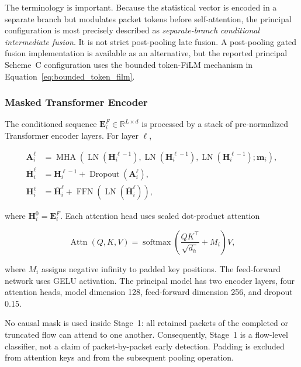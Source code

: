 The terminology is important. Because the statistical vector is encoded in a
separate branch but modulates packet tokens before self-attention, the principal
configuration is most precisely described as \emph{separate-branch conditional
intermediate fusion}. It is not strict post-pooling late fusion. A post-pooling
gated fusion implementation is available as an alternative, but the reported
principal Scheme~C configuration uses the bounded token-FiLM mechanism in
Equation~\ref{eq:bounded_token_film}.

\subsubsection{Masked Transformer Encoder}
\label{subsubsec:stage1_transformer}

The conditioned sequence
$\mathbf{E}^{F}_i\in\mathbb{R}^{L\times d}$ is processed by a stack of
pre-normalized Transformer encoder layers. For layer $\ell$,

\begin{align}
    \mathbf{A}^{\ell}_i
    &=\operatorname{MHA}
      \left(
        \operatorname{LN}(\mathbf{H}^{\ell-1}_i),
        \operatorname{LN}(\mathbf{H}^{\ell-1}_i),
        \operatorname{LN}(\mathbf{H}^{\ell-1}_i);
        \mathbf{m}_i
      \right),\\
    \overline{\mathbf{H}}^{\ell}_i
    &=\mathbf{H}^{\ell-1}_i
      +\operatorname{Dropout}(\mathbf{A}^{\ell}_i),\\
    \mathbf{H}^{\ell}_i
    &=\overline{\mathbf{H}}^{\ell}_i
      +\operatorname{FFN}
       \left(\operatorname{LN}(\overline{\mathbf{H}}^{\ell}_i)\right),
    \label{eq:stage1_transformer_layer}
\end{align}

where $\mathbf{H}^{0}_i=\mathbf{E}^{F}_i$. Each attention head uses scaled
dot-product attention

\begin{equation}
    \operatorname{Attn}(Q,K,V)
    =\operatorname{softmax}
      \left(
        \frac{QK^{\top}}{\sqrt{d_h}}+M_i
      \right)V,
    \label{eq:scaled_dot_product_attention}
\end{equation}

where $M_i$ assigns negative infinity to padded key positions. The feed-forward
network uses GELU activation. The principal model has two encoder layers, four
attention heads, model dimension 128, feed-forward dimension 256, and dropout
0.15.

No causal mask is used inside Stage~1: all retained packets of the completed or
truncated flow can attend to one another. Consequently, Stage~1 is a
flow-level classifier, not a claim of packet-by-packet early detection. Padding
is excluded from attention keys and from the subsequent pooling operation.

